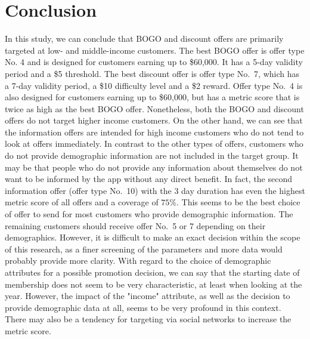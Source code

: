 \documentclass[11pt]{article} %
\begin{document}
\section{Conclusion}
In this study, we can conclude that BOGO and discount offers are primarily targeted at low- and middle-income customers. The best BOGO offer is offer type No. 4 and is designed for customers earning up to \$60,000.
It has a 5-day validity period and a \$5 threshold. 
The best discount offer is offer type No.~7, which has a 7-day validity period, a \$10 difficulty level and a \$2 reward.
Offer type No.~4 is also designed for customers earning up to \$60,000, but has a metric score that is twice as high as the best BOGO offer.
Nonetheless, both the BOGO and discount offers do not target higher income customers.
On the other hand, we can see that the information offers are intended for high income customers who do not tend to look at offers immediately.
In contrast to the other types of offers, customers who do not provide demographic information are not included in the target group.
It may be that people who do not provide any information about themselves do not want to be informed by the app without any direct benefit.
In fact, the second information offer (offer type No.~10) with the 3 day duration has even the highest metric score of all offers and a coverage of $75\%$.
This seems to be the best choice of offer to send for most customers who provide demographic information.
The remaining customers should receive offer No.~5 or 7 depending on their demographics.
However, it is difficult to make an exact decision within the scope of this research, as a finer screening of the parameters and more data would probably provide more clarity.
With regard to the choice of demographic attributes for a possible promotion decision, we can say that the starting date of membership does not seem to be very characteristic, at least when looking at the year.
However, the impact of the "income" attribute, as well as the decision to provide demographic data at all, seems to be very profound in this context.
There may also be a tendency for targeting via social networks to increase the metric score.
\end{document}
